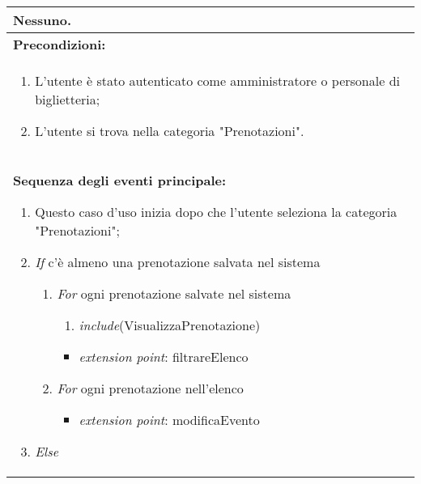 \documentclass{article}
\begin{document}
\begin{table}[t]
\begin{tabular}{|p{\linewidth}|}
        Nessuno. \\
        \hline
        \cellcolor{gray!20}
        \textbf{Precondizioni:} \\
        \cellcolor{gray!20}
        \begin{minipage}{\linewidth}
            \begin{enumerate}[noitemsep]
                \item L'utente è stato autenticato come amministratore o personale di biglietteria;
                \item L'utente si trova nella categoria "Prenotazioni". %
            \end{enumerate}
        \end{minipage}
        \vspace{0pt} \\
        \hline
        \textbf{Sequenza degli eventi principale:}
        \begin{enumerate}
            \item Questo caso d'uso inizia dopo che l'utente seleziona la categoria "Prenotazioni";
            \item \textit{If} c'è almeno una prenotazione salvata nel sistema
            \begin{enumerate}
                \item \textit{For} ogni prenotazione salvate nel sistema
                \begin{enumerate}
                    \item \textit{include}(VisualizzaPrenotazione)
                \end{enumerate}
                \begin{itemize}[noitemsep]
                    \item[] \hspace*{-\tabcolsep*3} \textit{extension point}: filtrareElenco
                \end{itemize}
                \item \textit{For} ogni prenotazione nell'elenco
                \begin{itemize}[noitemsep]
                    \item[] \textit{extension point}: modificaEvento
                \end{itemize}
            \end{enumerate}
            \item \textit{Else}
            \begin{enumerate}

\end{enumerate}
\end{enumerate}
\end{tabular}
\end{table}
\end{document}
